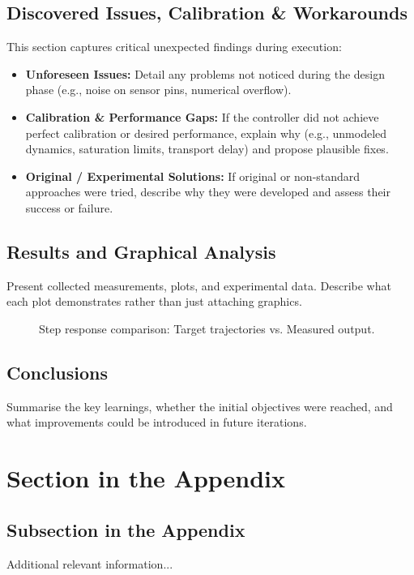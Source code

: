 \documentclass[english]{article}
\begin{document}
\subsection{Discovered Issues, Calibration \& Workarounds}

This section captures critical unexpected findings during execution:
\begin{itemize}
  \item \textbf{Unforeseen Issues:} Detail any problems not noticed during the design phase (e.g., noise on
        sensor pins, numerical overflow).
  \item \textbf{Calibration \& Performance Gaps:} If the controller did not achieve perfect calibration or
        desired performance, explain why (e.g., unmodeled dynamics, saturation limits, transport delay) and
        propose plausible fixes.
  \item \textbf{Original / Experimental Solutions:} If original or non-standard approaches were tried,
        describe why they were developed and assess their success or failure.
\end{itemize}

\subsection{Results and Graphical Analysis}

Present collected measurements, plots, and experimental data. Describe what each plot demonstrates rather
than just attaching graphics.

\begin{figure}[htbp]
  \centering
  \caption{Step response comparison: Target trajectories vs. Measured output.}
  \label{fig:step_response}
\end{figure}

\subsection{Conclusions}

Summarise the key learnings, whether the initial objectives were reached, and what improvements could be
introduced in future iterations.

\clearpage
\appendix

\section{Section in the Appendix}
\label{sec:app1}

\subsection{Subsection in the Appendix}
\label{subsec:app2}

Additional relevant information...
\end{document}

